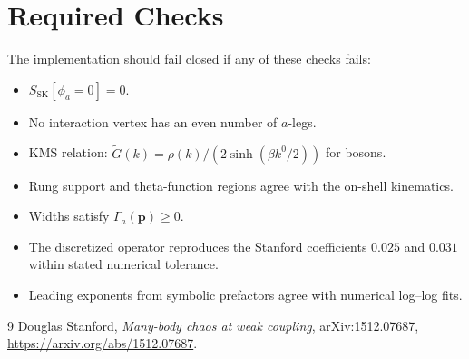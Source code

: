 \documentclass[11pt]{article}
\newcommand{\SK}{\mathrm{SK}}
\begin{document}
\section{Required Checks}

The implementation should fail closed if any of these checks fails:
\begin{itemize}
  \item \(S_{\SK}[\phi_a=0]=0\).
  \item No interaction vertex has an even number of \(a\)-legs.
  \item KMS relation: \(\widetilde G(k)=\rho(k)/(2\sinh(\beta k^0/2))\) for
  bosons.
  \item Rung support and theta-function regions agree with the on-shell
  kinematics.
  \item Widths satisfy \(\Gamma_a(\mathbf p)\ge 0\).
  \item The discretized operator reproduces the Stanford coefficients
  \(0.025\) and \(0.031\) within stated numerical tolerance.
  \item Leading exponents from symbolic prefactors agree with numerical
  log--log fits.
\end{itemize}

\begin{thebibliography}{9}
Douglas Stanford,
\emph{Many-body chaos at weak coupling},
arXiv:1512.07687,
\href{https://arxiv.org/abs/1512.07687}{https://arxiv.org/abs/1512.07687}.
\end{thebibliography}
\end{document}
